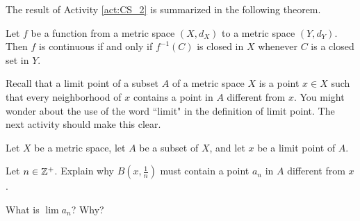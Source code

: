 \begin{comment}

\ActivitySolution

\ba
\item Since $C$ is closed, we know that $Y \setminus C$ is open. This means that $f^{-1}(Y \setminus C)$ is also open. Activity \ref{act:CS_1} tell us that $f^{-1}(Y \setminus B) = X \setminus f^{-1}(C)$. The fact that $X \setminus f^{-1}(C)$ is open implies that $f^{-1}(C)$ is closed. 

\item Suppose $O$ is an open set in $Y$. Then $Y \setminus O$ is a closed set. Activity \ref{act:CS_1} tells us that $f^{-1}(Y \setminus O) = X \setminus f^{-1}(O)$. That $X \setminus f^{-1}(O)$ is closed means that $f^{-1}(O)$ is open. Thus, $f$ is a continuous function. 

\ea

\end{comment}

The result of Activity \ref{act:CS_2} is summarized in the following theorem.

\begin{theorem} \label{thm:closed_sets_continuity_MS} Let $f$ be a function from a metric space $(X,d_X)$ to a metric space $(Y,d_Y)$. Then $f$ is continuous if and only if $f^{-1}(C)$ is closed in $X$ whenever $C$ is a closed set in $Y$.  
\end{theorem}

\label{sec_limit_bound_iso_seq}

Recall that a limit point of a subset $A$ of a metric space $X$ is a point $x \in X$ such that every neighborhood of $x$ contains a point in $A$ different from $x$. You might wonder about the use of the word ``limit" in the definition of limit point. The next activity should make this clear. 

\begin{activity} \label{act:CS_3} Let $X$ be a metric space, let $A$ be a subset of $X$, and let $x$ be a limit point of $A$. 
\ba
\item Let $n \in \mathbb{Z}^+$. Explain why $B\left(x, \frac{1}{n}\right)$ must contain a point $a_n$ in $A$ different from $x$. 

\item What is $\lim a_n$? Why?

\ea

\end{activity}

